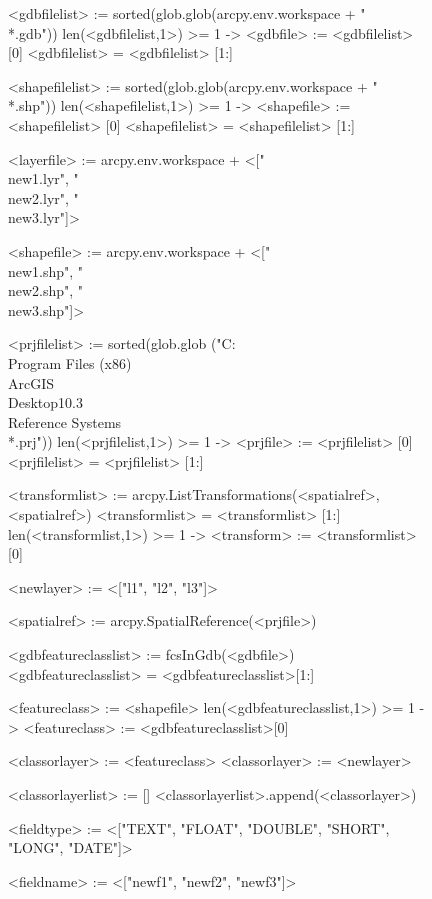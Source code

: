 \begin{figure}
{\scriptsize
\begin{code}
<gdbfilelist> := sorted(glob.glob(arcpy.env.workspace + "\\*.gdb"))
len(<gdbfilelist,1>) >= 1 -> <gdbfile> := <gdbfilelist> [0]
<gdbfilelist> = <gdbfilelist> [1:]

<shapefilelist> := sorted(glob.glob(arcpy.env.workspace + "\\*.shp"))
len(<shapefilelist,1>) >= 1 -> <shapefile> := <shapefilelist> [0]
<shapefilelist> = <shapefilelist> [1:]

<layerfile> := arcpy.env.workspace + <["\\new1.lyr", "\\new2.lyr", "\\new3.lyr"]>

<shapefile> := arcpy.env.workspace + <["\\new1.shp", "\\new2.shp", "\\new3.shp"]>

<prjfilelist> := sorted(glob.glob
   ("C:\\Program Files (x86)\\ArcGIS\\Desktop10.3\\Reference Systems\\*.prj"))
len(<prjfilelist,1>) >= 1 -> <prjfile> := <prjfilelist> [0]
<prjfilelist> = <prjfilelist> [1:]

<transformlist> := arcpy.ListTransformations(<spatialref>,<spatialref>)
<transformlist> = <transformlist> [1:]
len(<transformlist,1>) >= 1 -> <transform> := <transformlist> [0]

<newlayer> := <["l1", "l2", "l3"]>

<spatialref> := arcpy.SpatialReference(<prjfile>)

<gdbfeatureclasslist> := fcsInGdb(<gdbfile>)
<gdbfeatureclasslist> = <gdbfeatureclasslist>[1:]

<featureclass> := <shapefile>
len(<gdbfeatureclasslist,1>) >= 1 -> <featureclass> := <gdbfeatureclasslist>[0]

<classorlayer> := <featureclass>
<classorlayer> := <newlayer>

<classorlayerlist> := []
<classorlayerlist>.append(<classorlayer>)

<fieldtype> := <["TEXT", "FLOAT", "DOUBLE", "SHORT", "LONG", "DATE"]>

<fieldname> := <["newf1", "newf2", "newf3"]>


\end{code}}
\end{figure}
